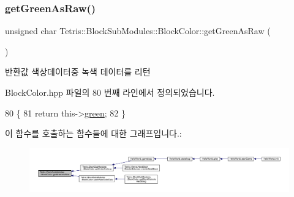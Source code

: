 \mbox{\label{class_tetris_1_1_block_sub_modules_1_1_block_color_a65e9230325a2f44aa433f39c199aabcd}} 
\subsubsection{\texorpdfstring{get\+Green\+As\+Raw()}{getGreenAsRaw()}}
{\footnotesize\ttfamily unsigned char Tetris\+::\+Block\+Sub\+Modules\+::\+Block\+Color\+::get\+Green\+As\+Raw (\begin{DoxyParamCaption}{ }\end{DoxyParamCaption})\hspace{0.3cm}{\ttfamily [inline]}}

\begin{DoxyReturn}{반환값}
색상데이터중 녹색 데이터를 리턴 
\end{DoxyReturn}


Block\+Color.\+hpp 파일의 80 번째 라인에서 정의되었습니다.


\begin{DoxyCode}
80                                          \{
81                 \textcolor{keywordflow}{return} this->\hyperlink{class_tetris_1_1_block_sub_modules_1_1_block_color_a4b28885bfd8bf53793c6b3daedd974eb}{green};
82             \}
\end{DoxyCode}
이 함수를 호출하는 함수들에 대한 그래프입니다.\+:
\nopagebreak
\begin{figure}[H]
\begin{center}
\leavevmode
\includegraphics[width=350pt]{de/d44/class_tetris_1_1_block_sub_modules_1_1_block_color_a65e9230325a2f44aa433f39c199aabcd_icgraph}
\end{center}
\end{figure}
\mbox{\label{class_tetris_1_1_block_sub_modules_1_1_block_color_a1795cf70c847d261645a9690afff7e9c}} 
